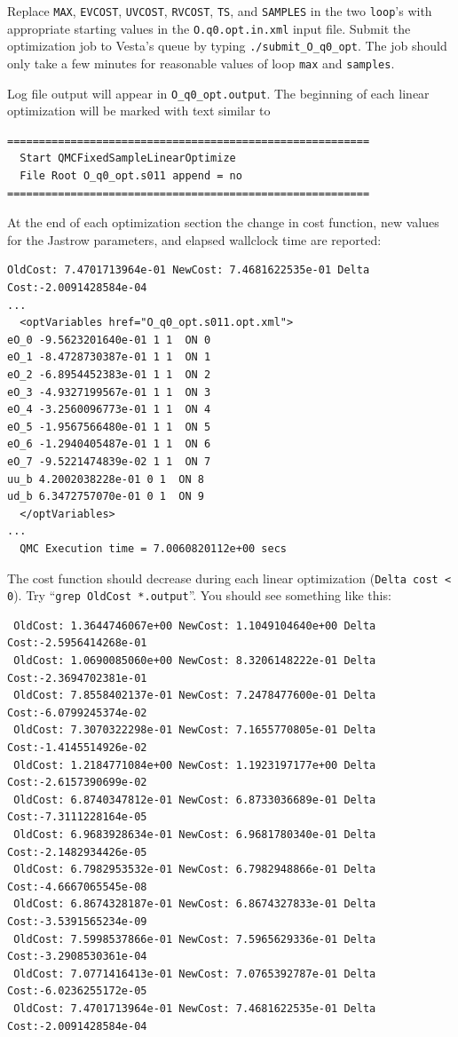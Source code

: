 Replace \texttt{MAX}, \texttt{EVCOST}, \texttt{UVCOST}, \texttt{RVCOST}, \texttt{TS}, and \texttt{SAMPLES} in the two \texttt{loop}'s with appropriate starting values in the \texttt{O.q0.opt.in.xml} input file.  Submit the optimization job to Vesta's queue by typing \texttt{./submit\_O\_q0\_opt}.  The job should only take a few minutes for reasonable values of loop \texttt{max} and \texttt{samples}.  

Log file output will appear in \texttt{O\_q0\_opt.output}.  The beginning of each linear optimization will be marked with text similar to
\begin{shaded}
\begin{verbatim}
=========================================================
  Start QMCFixedSampleLinearOptimize
  File Root O_q0_opt.s011 append = no 
=========================================================
\end{verbatim}
\end{shaded}
\noindent
At the end of each optimization section the change in cost function, new values for the Jastrow parameters, and elapsed wallclock time are reported:
\begin{shaded}
\begin{verbatim}
OldCost: 7.4701713964e-01 NewCost: 7.4681622535e-01 Delta Cost:-2.0091428584e-04
...
  <optVariables href="O_q0_opt.s011.opt.xml">
eO_0 -9.5623201640e-01 1 1  ON 0
eO_1 -8.4728730387e-01 1 1  ON 1
eO_2 -6.8954452383e-01 1 1  ON 2
eO_3 -4.9327199567e-01 1 1  ON 3
eO_4 -3.2560096773e-01 1 1  ON 4
eO_5 -1.9567566480e-01 1 1  ON 5
eO_6 -1.2940405487e-01 1 1  ON 6
eO_7 -9.5221474839e-02 1 1  ON 7
uu_b 4.2002038228e-01 0 1  ON 8
ud_b 6.3472757070e-01 0 1  ON 9
  </optVariables>
...
  QMC Execution time = 7.0060820112e+00 secs 
\end{verbatim}
\end{shaded}
\noindent
The cost function should decrease during each linear optimization (\texttt{Delta cost < 0}).  Try ``\texttt{grep OldCost *.output}''.  You should see something like this:
\begin{shaded}
\begin{verbatim}
 OldCost: 1.3644746067e+00 NewCost: 1.1049104640e+00 Delta Cost:-2.5956414268e-01
 OldCost: 1.0690085060e+00 NewCost: 8.3206148222e-01 Delta Cost:-2.3694702381e-01
 OldCost: 7.8558402137e-01 NewCost: 7.2478477600e-01 Delta Cost:-6.0799245374e-02
 OldCost: 7.3070322298e-01 NewCost: 7.1655770805e-01 Delta Cost:-1.4145514926e-02
 OldCost: 1.2184771084e+00 NewCost: 1.1923197177e+00 Delta Cost:-2.6157390699e-02
 OldCost: 6.8740347812e-01 NewCost: 6.8733036689e-01 Delta Cost:-7.3111228164e-05
 OldCost: 6.9683928634e-01 NewCost: 6.9681780340e-01 Delta Cost:-2.1482934426e-05
 OldCost: 6.7982953532e-01 NewCost: 6.7982948866e-01 Delta Cost:-4.6667065545e-08
 OldCost: 6.8674328187e-01 NewCost: 6.8674327833e-01 Delta Cost:-3.5391565234e-09
 OldCost: 7.5998537866e-01 NewCost: 7.5965629336e-01 Delta Cost:-3.2908530361e-04
 OldCost: 7.0771416413e-01 NewCost: 7.0765392787e-01 Delta Cost:-6.0236255172e-05
 OldCost: 7.4701713964e-01 NewCost: 7.4681622535e-01 Delta Cost:-2.0091428584e-04
\end{verbatim}
\end{shaded}

